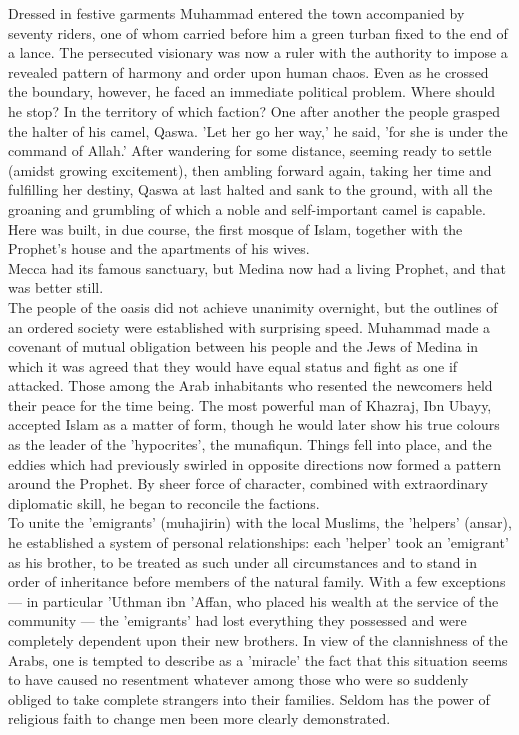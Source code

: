 \documentclass[10pt, twoside]{book}
\begin{document}
Dressed in festive garments Muhammad entered the town accompanied by seventy riders, one of whom 
carried before him a green turban fixed to the end of a lance. The persecuted visionary was now a 
ruler with the authority to impose a revealed pattern of harmony and order upon human chaos. Even as 
he crossed the boundary, however, he faced an immediate political problem. Where should he stop? In 
the territory of which faction? One after another the people grasped the halter of his camel, Qaswa. 
'Let her go her way,' he said, 'for she is under the command of Allah.' After wandering for some 
distance, seeming ready to settle (amidst growing excitement), then ambling forward again, taking her 
time and fulfilling her destiny, Qaswa at last halted and sank to the ground, with all the groaning 
and grumbling of which a noble and self\hyp{}important camel is capable. Here was built, in due course, 
the first mosque of Islam, together with the Prophet's house and the apartments of his wives. \\

Mecca had its famous sanctuary, but Medina now had a living Prophet, and that was better still. \\

The people of the oasis did not achieve unanimity overnight, but the outlines of an ordered society 
were established with surprising speed. Muhammad made a covenant of mutual obligation between his 
people and the Jews of Medina in which it was agreed that they would have equal status and fight as 
one if attacked. Those among the Arab inhabitants who resented the newcomers held their peace for the 
time being. The most powerful man of Khazraj, Ibn Ubayy, accepted Islam as a matter of form, though 
he would later show his true colours as the leader of the 'hypocrites', the munafiqun. Things fell 
into place, and the eddies which had previously swirled in opposite directions now formed a pattern 
around the Prophet. By sheer force of character, combined with extraordinary diplomatic skill, he 
began to reconcile the factions. \\

To unite the 'emigrants' (muhajirin) with the local Muslims, the 'helpers' (ansar), he established a 
system of personal relationships: each 'helper' took an 'emigrant' as his brother, to be treated as 
such under all circumstances and to stand in order of inheritance before members of the natural 
family. With a few exceptions --- in particular 'Uthman ibn 'Affan, who placed his wealth at the 
service of the community --- the 'emigrants' had lost everything they possessed and were completely 
dependent upon their new brothers. In view of the clannishness of the Arabs, one is tempted to 
describe as a 'miracle' the fact that this situation seems to have caused no resentment whatever 
among those who were so suddenly obliged to take complete strangers into their families. Seldom has 
the power of religious faith to change men been more clearly demonstrated. \\
\end{document}
